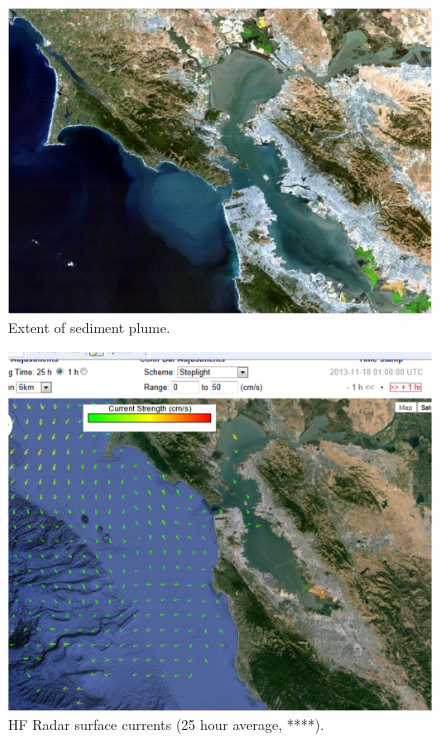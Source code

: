 \begin{figure}
	\centering
		\includegraphics[scale=0.6]{image/plume2}
	\caption{Extent of sediment plume.}
	\label{fig:plume2}
\end{figure}

\begin{figure}
	\centering
		\includegraphics[scale=0.6]{image/hfradar.pdf}
	\caption{HF Radar surface currents (25 hour average, ****).}
	\label{fig:hfradar}
\end{figure}

